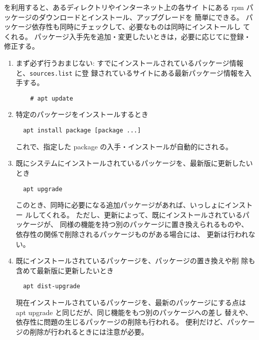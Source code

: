 \documentclass{jreport}
\begin{document}
 を利用すると、あるディレクトリやインターネット上の各サイ
トにある rpm パッケージのダウンロードとインストール、アップグレードを
簡単にできる。
パッケージ依存性も同時にチェックして、必要なものは同時にインストールし
てくれる。
パッケージ入手先を追加・変更したいときは，必要に応じてに登録・修正する。
\begin{enumerate}
  \item まず必ず行うおまじない:
  すでにインストールされているパッケージ情報と、\verb|sources.list| に登
  録されているサイトにある最新パッケージ情報を入手する。
  \begin{screen}
  \begin{verbatim}
    # apt update
  \end{verbatim}
\end{screen}

\item  特定のパッケージをインストールするとき
\begin{screen}
\begin{verbatim}
  apt install package [package ...]
\end{verbatim}
\end{screen}

これで、指定した package の入手・インストールが自動的にされる。

\item  既にシステムにインストールされているパッケージを、最新版に更新したいとき
\begin{screen}
\begin{verbatim}
  apt upgrade
\end{verbatim}
\end{screen}

このとき、同時に必要になる追加パッケージがあれば、いっしょにインストー
ルしてくれる。
ただし、更新によって、既にインストールされているパッケージが、
同様の機能を持つ別のパッケージに置き換えられるものや、
依存性の関係で削除されるパッケージものがある場合には、
更新は行われない。

\item 既にインストールされているパッケージを、パッケージの置き換えや削
  除も含めて最新版に更新したいとき
\begin{screen}
\begin{verbatim}
  apt dist-upgrade
\end{verbatim}
\end{screen}
現在インストールされているパッケージを、最新のパッケージにする点は
apt upgrade と同じだが、同じ機能をもつ別のパッケージへの差し
替えや、依存性に問題の生じるパッケージの削除も行われる。
便利だけど、パッケージの削除が行われるときには注意が必要。
\end{enumerate}
\end{document}
